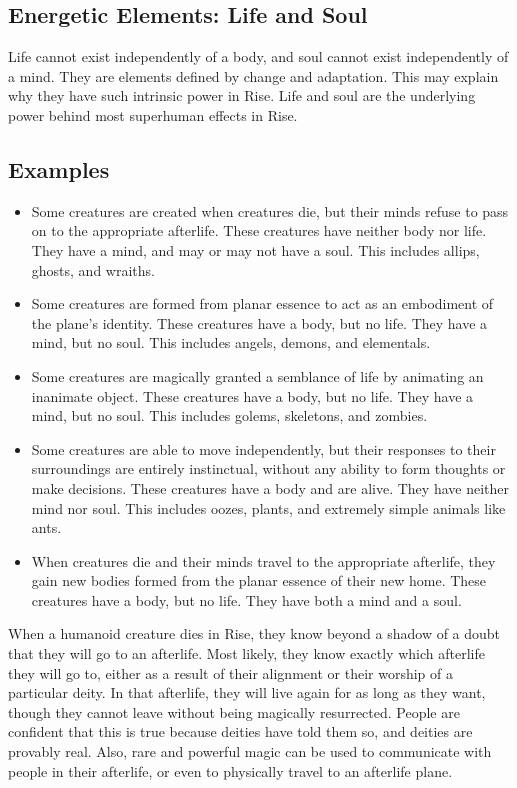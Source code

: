   \subsection{Energetic Elements: Life and Soul}
    Life cannot exist independently of a body, and soul cannot exist independently of a mind.
    They are elements defined by change and adaptation.
    This may explain why they have such intrinsic power in Rise.
    Life and soul are the underlying power behind most superhuman effects in Rise.

  \subsection{Examples}
    \begin{itemize}
      \item Some creatures are created when creatures die, but their minds refuse to pass on to the appropriate afterlife. These creatures have neither body nor life. They have a mind, and may or may not have a soul. This includes allips, ghosts, and wraiths.
      \item Some creatures are formed from planar essence to act as an embodiment of the plane's identity. These creatures have a body, but no life. They have a mind, but no soul. This includes angels, demons, and elementals.
      \item Some creatures are magically granted a semblance of life by animating an inanimate object. These creatures have a body, but no life. They have a mind, but no soul. This includes golems, skeletons, and zombies.
      \item Some creatures are able to move independently, but their responses to their surroundings are entirely instinctual, without any ability to form thoughts or make decisions. These creatures have a body and are alive. They have neither mind nor soul. This includes oozes, plants, and extremely simple animals like ants.
      \item When creatures die and their minds travel to the appropriate afterlife, they gain new bodies formed from the planar essence of their new home. These creatures have a body, but no life. They have both a mind and a soul.
    \end{itemize}


  When a humanoid creature dies in Rise, they know beyond a shadow of a doubt that they will go to an afterlife.
  Most likely, they know exactly which afterlife they will go to, either as a result of their alignment or their worship of a particular deity.
  In that afterlife, they will live again for as long as they want, though they cannot leave without being magically resurrected.
  People are confident that this is true because deities have told them so, and deities are provably real.
  Also, rare and powerful magic can be used to communicate with people in their afterlife, or even to physically travel to an afterlife plane.

